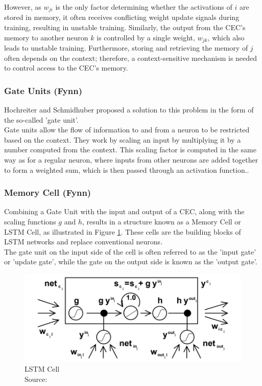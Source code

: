 \documentclass[twoside,a4paper,10pt,DIV=12,BCOR=12mm]{scrartcl}
\begin{document}
However, as $w_{ji}$ is the only factor determining whether the activations of $i$ are stored in memory, it often receives conflicting weight update signals during training, resulting in unstable training. Similarly, the output from the CEC's memory to another neuron $k$ is controlled by a single weight, $w_{jk}$, which also leads to unstable training. Furthermore, storing and retrieving the memory of $j$ often depends on the context; therefore, a context-sensitive mechanism is needed to control access to the CEC's memory.\cite{hochreiter1997lstm}

\subsubsection{Gate Units (Fynn)}

Hochreiter and Schmidhuber proposed a solution to this problem in the form of the so-called 'gate unit'.\cite{hochreiter1991}\\
Gate units allow the flow of information to and from a neuron to be restricted based on the context.
They work by scaling an input by multiplying it by a number computed from the context. This scaling factor is computed in the same way as for a regular neuron, where inputs from other neurons are added together to form a weighted sum, which is then passed through an activation function..\cite{hochreiter1997lstm}

\subsubsection{Memory Cell (Fynn)}
Combining a Gate Unit with the input and output of a CEC, along with the scaling functions $g$ and $h$, results in a structure known as a Memory Cell or LSTM Cell, as illustrated in Figure \ref{fig:lstm-cell}. These cells are the building blocks of LSTM networks and replace conventional neurons.\cite{hochreiter1997lstm} \\
The gate unit on the input side of the cell is often referred to as the 'input gate' or 'update gate', while the gate on the output side is known as the 'output gate'.\cite{hochreiter1997lstm} \\
\begin{figure}[h!]
    \centering
    \includegraphics[width=\linewidth]{LSTM-Cell-Diagram.png}
    \caption{LSTM Cell\\ Source: \cite{hochreiter1997lstm}}
    \label{fig:lstm-cell}
\end{figure}
\end{document}

